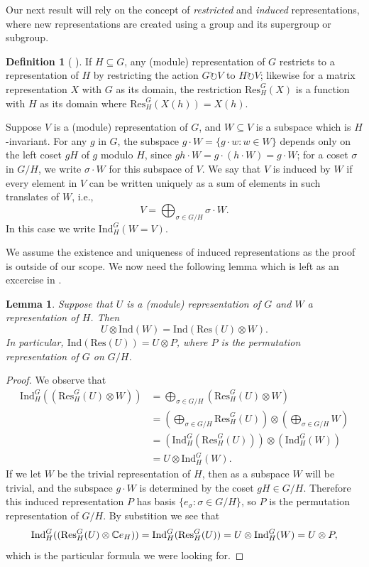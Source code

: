\documentclass[12pt,twoside]{reedthesis}
\theoremstyle{plain}   %
\newtheorem{lemma}{Lemma}[section]
\theoremstyle{definition}
\newtheorem{defn}{Definition}[section]
\theoremstyle{remark}
\numberwithin{equation}{section}
\def\ind{\mathrm{Ind}}
\def\res{\mathrm{Res}}
\def\acts{\circlearrowright} %
\begin{document}
  Our next result will rely on the concept of \emph{restricted} and \emph{induced} representations, where new representations are created using a group and its supergroup or subgroup.
  \begin{defn}[{ \cite[Section 3.3]{fulton2004} }]
    If $H \subseteq G$, any (module) representation of $G$ restricts to a representation of $H$ by restricting the action $G \acts V$ to $H \acts V$; likewise for a matrix representation $X$ with $G$ as its domain,
    the restriction $\res_H^G (X)$ is a function with $H$ as its domain where $\res_H^G(X(h)) = X(h)$.
    \par
    Suppose $V$ is a (module) representation of $G$, and $W \subseteq V$ is a subspace which is $H$-invariant.
    For any $g$ in $G$, the subspace $g \cdot W = \{ g \cdot w: w \in W\}$ depends only on the left coset $gH$ of $g$ modulo $H$, since $gh \cdot W = g \cdot (h \cdot W) = g \cdot W$;
    for a coset $\sigma$ in $G/H$, we write $\sigma \cdot W$ for this subspace of $V$. We say that $V$ is induced by $W$ if every element in $V$ can be written uniquely as a sum of elements in such translates of $W$, i.e.,
    \[ V = \bigoplus_{\sigma \in G/H} \sigma \cdot W.\]
    In this case we write $\ind^G_H (W = V)$.
  \end{defn}
  We assume the existence and uniqueness of induced representations as the proof is outside of our scope.
  We now need the following lemma which is left as an excercise in \cite[Excercise 3.16]{fulton2004}.
  \begin{lemma}
    Suppose that $U$ is a (module) representation of $G$ and $W$ a representation of $H$. Then
    \[ U \otimes \ind (W) = \ind( \res (U) \otimes W).\]
    In particular, $\ind ( \res (U)) = U \otimes P$, where $P$ is the permutation representation of $G$ on $G/H$.
  \end{lemma}
  \begin{proof}
    We observe that
    \begin{align*}
      \ind^G_H ((\res^G_H(U) \otimes W)) &= \bigoplus_{\sigma \in G/H} ( \res^G_H(U) \otimes W) \\
                                       &= (\bigoplus_{\sigma \in G/H}  \res^G_H(U)) \otimes (\bigoplus_{\sigma \in G/H} W) \\
                                       &= ( \ind^G_H (\res^G_H(U))) \otimes ( \ind^G_H ( W)) \\
                                       &= U \otimes \ind^G_H (W).
    \end{align*}
    If we let $W$ be the trivial representation of $H$, then as a subspace $W$ will be trivial, and the subspace $g \cdot W$ is determined by the coset $gH \in G/H$. Therefore
    this induced representation $P$ has basis $\{e_\sigma : \sigma \in G/H\}$,
    so $P$ is the permutation representation of $G/H$.
    By substition we see that
    \[ \ind^G_H ((\res^G_H(U) \otimes \CC e_H)) =  \ind^G_H (\res^G_H(U)) = U \otimes \ind^G_H (W) = U \otimes P,\]
    which is the particular formula we were looking for.
  \end{proof}
\end{document}
